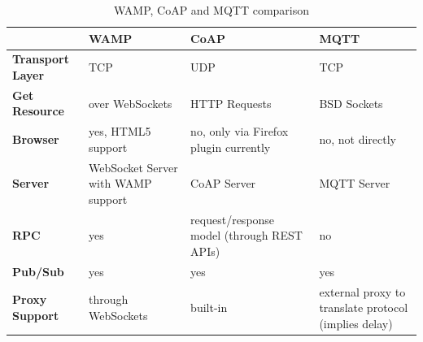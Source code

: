 \begin{table}
\begin{tabular}{|p{3.3cm}|>{\centering\arraybackslash}p{3cm}|>{\centering\arraybackslash}p{3cm}|>{\centering\arraybackslash}p{3.3cm}|} 
\hline %
\textbf{ } & \textbf{WAMP} & \textbf{CoAP} & \textbf{MQTT} \\ 
\hline 
\textbf{Transport Layer} & TCP & UDP & TCP \\ 
\hline
\textbf{Get Resource} & over WebSockets & HTTP Requests & BSD Sockets \\
\hline
\textbf{Browser} & yes, HTML5 support & no, only via Firefox plugin currently & no, not directly \\
\hline
\textbf{Server} & WebSocket Server with WAMP support & CoAP Server & MQTT Server \\
\hline
\textbf{RPC} & yes & request/response model (through REST APIs) & no \\
\hline
\textbf{Pub/Sub} & yes & yes & yes \\
\hline
\textbf{Proxy Support} & through WebSockets & built-in & external proxy to translate protocol (implies delay) \\
\hline
\end{tabular} %
\caption{WAMP, CoAP and MQTT comparison}
\label{table:WAMPCoAPandMQTTcomparison}
\end{table} %
